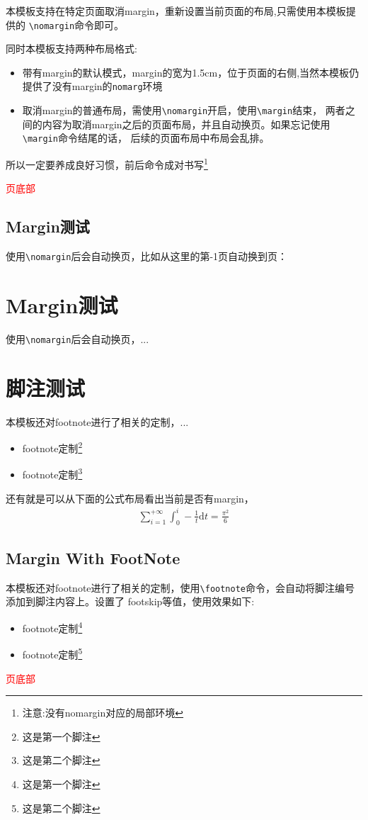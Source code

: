 本模板支持在特定页面取消margin，重新设置当前页面的布局,只需使用本模板提供的
\verb|\nomargin|命令即可。

同时本模板支持两种布局格式:
\begin{itemize}
    \item 带有margin的默认模式，margin的宽为1.5cm，位于页面的右侧,当然本模板仍提供了没有margin的\verb|nomarg|环境
    \item 取消margin的普通布局，需使用\verb|\nomargin|开启，使用\verb|\margin|结束，
        两者之间的内容为取消margin之后的页面布局，并且自动换页。如果忘记使用\verb|\margin|命令结尾的话，
        后续的页面布局中布局会乱排。
\end{itemize}

所以一定要养成良好习惯，前后命令成对书写\footnote[1]{注意:没有nomargin对应的局部环境}

\vfill 

\textcolor{red}{\thepage{}页底部}


\nomargin
\subsection{Margin测试}
使用\verb|\nomargin|后会自动换页，比如从这里的第\number\numexpr\value{page}-1页自动换到\thepage{}页：
\begin{bytes}
\nomargin
\section{Margin测试}
使用\verb|\nomargin|后会自动换页，...

\section{脚注测试}
本模板还对footnote进行了相关的定制，...
\begin{itemize}
    \item footnote定制\footnote[1]{这是第一个脚注}
    \item footnote定制\footnote[2]{这是第二个脚注}
\end{itemize}
\margin
\end{bytes}

还有就是可以从下面的公式布局看出当前是否有margin，
\begin{align}
    \sum_{i=1}^{+\infty}{\int_{0}^{i}-\frac{1}{t}\mathrm{d}t} = \frac{\pi^2}{6}
\end{align}


\subsection{Margin With FootNote}
本模板还对footnote进行了相关的定制，使用\verb|\footnote|命令，会自动将脚注编号添加到脚注内容上。设置了
footskip等值，使用效果如下:
\begin{itemize}
    \item footnote定制\footnote[1]{这是第一个脚注}
    \item footnote定制\footnote[2]{这是第二个脚注}
\end{itemize}
\vfill 

\textcolor{red}{\thepage{}页底部}
\margin
